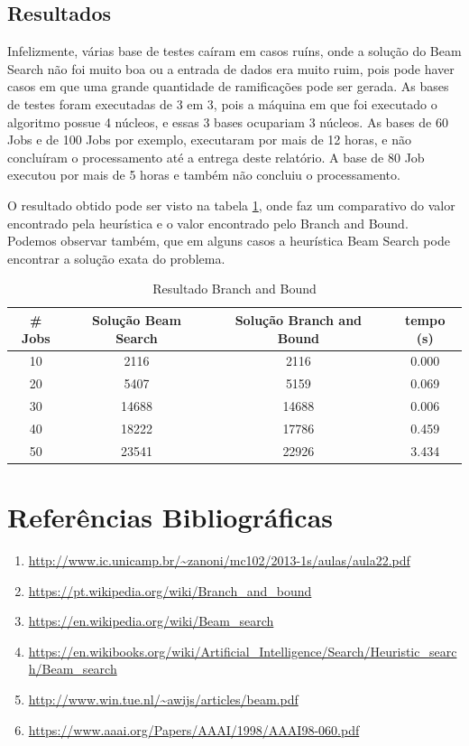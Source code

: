\documentclass[a4paper,12pt]{article}
\begin{document}
\subsection{Resultados}

Infelizmente, várias base de testes caíram em casos ruíns, onde a solução do Beam Search não foi muito boa ou 
a entrada de dados era muito ruim, pois pode haver casos em que uma grande quantidade de ramificações pode ser 
gerada.
As bases de testes foram executadas de 3 em 3, pois a máquina em que foi executado o algoritmo possue 4 núcleos, 
e essas 3 bases ocupariam 3 núcleos. 
As bases de 60 Jobs e de 100 Jobs por exemplo, executaram por mais de 12 horas, e não concluíram o processamento 
até a entrega deste relatório.
A base de 80 Job executou por mais de 5 horas e também não concluiu o processamento.

O resultado obtido pode ser visto na tabela \ref{BB}, onde faz um comparativo do valor encontrado pela heurística 
e o valor encontrado pelo Branch and Bound.
Podemos observar também, que em alguns casos a heurística Beam Search pode encontrar a solução exata do problema.


\begin{table}[H]
\centering
\caption{Resultado Branch and Bound} \label{BB}
\begin{tabular}{cccc}
\hline
\# Jobs & Solução Beam Search & Solução Branch and Bound & tempo (s) \\
\hline
	10 & 2116 & 2116 & 0.000 \\
	20 & 5407 & 5159 & 0.069 \\
	30 & 14688 & 14688 & 0.006 \\
	40 & 18222 & 17786 & 0.459 \\
	50 & 23541 & 22926 & 3.434 \\
\hline
\end{tabular}
\end{table}




\newpage

\section{Referências Bibliográficas}
\begin{enumerate}
\item \url{http://www.ic.unicamp.br/~zanoni/mc102/2013-1s/aulas/aula22.pdf} 
\item \url{https://pt.wikipedia.org/wiki/Branch_and_bound} 
\item \url{https://en.wikipedia.org/wiki/Beam_search} 
\item \url{https://en.wikibooks.org/wiki/Artificial_Intelligence/Search/Heuristic_search/Beam_search} 
\item \url{http://www.win.tue.nl/~awijs/articles/beam.pdf}
\item \url{https://www.aaai.org/Papers/AAAI/1998/AAAI98-060.pdf} 
\end{enumerate}
\end{document}
